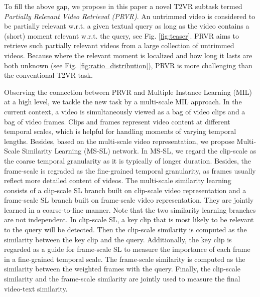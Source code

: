 \documentclass[sigconf]{acmart}
\begin{document}
To fill the above gap, we propose in this paper a novel T2VR subtask termed \textit{Partially Relevant Video Retrieval (PRVR)}.
An untrimmed video is considered to be partially relevant w.r.t. a given textual query as long as the video contains a (short) moment relevant w.r.t. the query, see Fig. \ref{fig:teaser}.
PRVR aims to retrieve such partially relevant videos from a large collection of untrimmed videos.
Because where the relevant moment is localized and how long it lasts are both unknown (see Fig. \ref{fig:ratio_distribution}), PRVR is more challenging than the conventional T2VR task.

Observing the connection between PRVR and Multiple Instance Learning (MIL) \cite{dietterich1997solving,maron1997framework} at a high level, we tackle the new task by a multi-scale MIL approach.
In the current context, a video is simultaneously viewed as a bag of video clips and a bag of video frames. 
Clips and frames represent video content at different temporal scales, which is helpful for handling moments of varying temporal lengths.
Besides, based on the multi-scale video representation, we propose Multi-Scale Similarity Learning (MS-SL) network. In MS-SL, we regard the clip-scale as the coarse temporal granularity as it is typically of longer duration. Besides, the frame-scale is regraded as the fine-grained temporal granularity, as frames usually reflect more detailed content of videos.
The multi-scale similarity learning consists of a clip-scale SL branch built on clip-scale video representation and a frame-scale SL branch built on frame-scale video representation.
They are jointly learned in a coarse-to-fine manner.
Note that the two similarity learning branches are not independent. In clip-scale SL, a key clip that is most likely to be
relevant to the query will be detected.
Then the clip-scale similarity is computed as the similarity between the key clip and the query. Additionally, the key clip is regarded as a guide for frame-scale SL to measure the importance of each frame in a fine-grained temporal scale. The frame-scale similarity is computed as the similarity between the weighted frames with the query. Finally, the clip-scale similarity and the frame-scale similarity are jointly used to measure the final video-text similarity.
\end{document}
